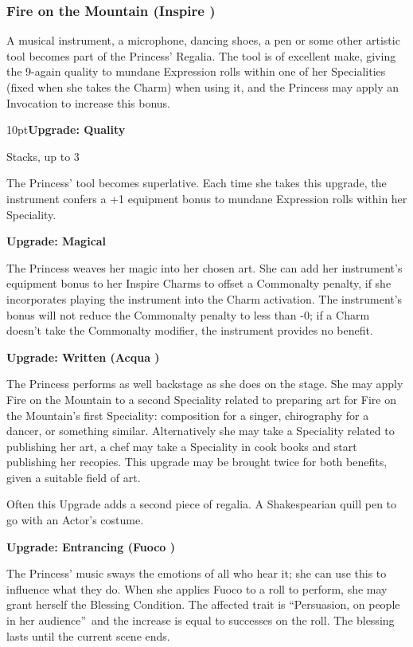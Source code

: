 \subsubsection*{Fire on the Mountain (Inspire \textbullet)}

A musical instrument, a microphone, dancing shoes, a pen or some other artistic tool becomes part of the Princess' Regalia. The tool is of excellent make, giving the 9-again quality to mundane Expression rolls within one of her Specialities (fixed when she takes the Charm) when using it, and the Princess may apply an Invocation to increase this bonus. 

\begin{myindentpar}{10pt}\textbf{Upgrade: Quality}

Stacks, up to 3

The Princess' tool becomes superlative. Each time she takes this upgrade, the instrument confers a +1 equipment bonus to mundane Expression rolls within her Speciality.

\textbf{Upgrade: Magical}

The Princess weaves her magic into her chosen art. She can add her instrument's equipment bonus to her Inspire Charms to offset a Commonalty penalty, if she incorporates playing the instrument into the Charm activation. The instrument's bonus will not reduce the Commonalty penalty to less than -0; if a Charm doesn't take the Commonalty modifier, the instrument provides no benefit.

\textbf{Upgrade: Written (Acqua \textbullet\textbullet)}

The Princess performs as well backstage as she does on the stage. She may apply Fire on the Mountain to a second Speciality related to preparing art for Fire on the Mountain's first Speciality: composition for a singer, chirography for a dancer, or something similar. Alternatively she may take a Speciality related to publishing her art, a chef may take a Speciality in cook books and start publishing her recopies. This upgrade may be brought twice for both benefits, given a suitable field of art. 

Often this Upgrade adds a second piece of regalia. A Shakespearian quill pen to go with an Actor's costume. 

\textbf{Upgrade: Entrancing (Fuoco \textbullet\textbullet)}

The Princess' music sways the emotions of all who hear it; she can use this to influence what they do. When she applies Fuoco to a roll to perform, she may grant herself the Blessing Condition. The affected trait is \textquotedblleft Persuasion, on people in her audience\textquotedblright\, and the increase is equal to successes on the roll. The blessing lasts until the current scene ends. 


\end{myindentpar}
